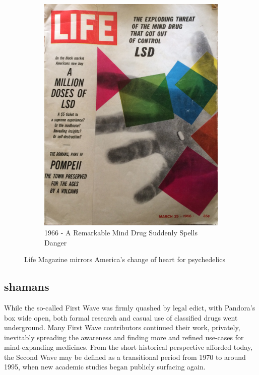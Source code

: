 \documentclass{UIdahoMastersThesis}
\begin{document}
\begin{figure}
\begin{subfigure}[b]{0.4\linewidth}
    \includegraphics[width=\linewidth]{life66.png}
    \caption{1966 - A Remarkable Mind Drug Suddenly Spells Danger}
  \end{subfigure}
  \caption{Life Magazine mirrors America's change of heart for psychedelics}
  \label{fig:life}
\end{figure}



\subsection{shamans}

While the so-called First Wave was firmly quashed by legal edict, with Pandora's box wide open, both formal research and casual use of classified drugs went underground. Many First Wave contributors continued their work, privately, inevitably spreading the awareness and finding more and refined use-cases for mind-expanding medicines. From the short historical perspective afforded today, the Second Wave may be defined as a transitional period from 1970 to around 1995, when new academic studies began publicly surfacing again.
\end{document}
